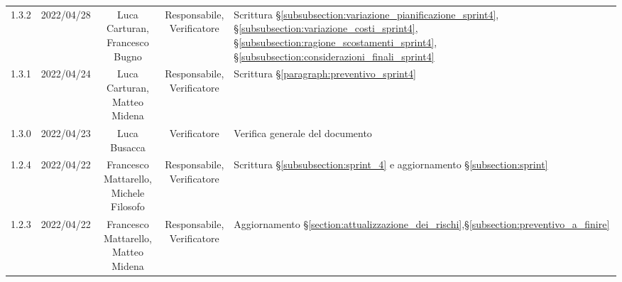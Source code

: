 \begin{center}
\begin{longtable}[c]{c | c | c | c | p{5cm}}
		1.3.2                                                      & 2022/04/28 & \Shortunderstack{Luca Carturan,                                                                                                                                                                     \\Francesco Bugno} & \Shortunderstack{Responsabile,\\Verificatore} & Scrittura §\ref{subsubsection:variazione_pianificazione_sprint4}, §\ref{subsubsection:variazione_costi_sprint4}, §\ref{subsubsection:ragione_scostamenti_sprint4}, §\ref{subsubsection:considerazioni_finali_sprint4}\\
		1.3.1                                                      & 2022/04/24 & \Shortunderstack{Luca Carturan,                                                                                                                                                                     \\Matteo Midena} & \Shortunderstack{Responsabile,\\Verificatore} & Scrittura §\ref{paragraph:preventivo_sprint4}\\
		1.3.0                                                      & 2022/04/23 & Luca Busacca                           & Verificatore   & Verifica generale del documento                                                                                                           \\
		1.2.4                                                      & 2022/04/22 & \Shortunderstack{Francesco Mattarello,                                                                                                                                                              \\Michele Filosofo} & \Shortunderstack{Responsabile,\\Verificatore} & Scrittura §\ref{subsubsection:sprint_4} e aggiornamento §\ref{subsection:sprint}\\
		1.2.3                                                      & 2022/04/22 & \Shortunderstack{Francesco Mattarello,                                                                                                                                                              \\Matteo Midena} & \Shortunderstack{Responsabile,\\Verificatore} & Aggiornamento §\ref{section:attualizzazione_dei_rischi},§\ref{subsection:preventivo_a_finire}\\

\end{longtable}
\end{center}
